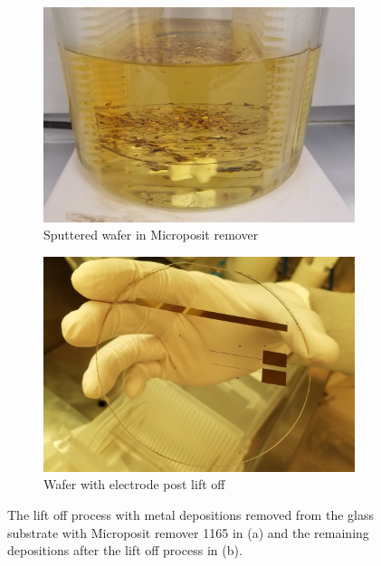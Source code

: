 \begin{figure}
    \centering
    \begin{subfigure}[b]{0.45\textwidth}
        \includegraphics[width=\textwidth]{images/lift_off.jpg}
        \caption{Sputtered wafer in Microposit remover}
        \label{fig:lift_solution}
    \end{subfigure}
    \hfill
    \begin{subfigure}[b]{0.45\textwidth}
        \centering
        \includegraphics[width=\textwidth]{images/electrodes.jpg}
        \caption{Wafer with electrode post lift off}
        \label{fig:electrode_methods}
    \end{subfigure} 
    \caption[Lift off]{The lift off process with metal depositions removed from the glass substrate with Microposit remover 1165 in (a) and the remaining depositions after the lift off process in (b).}
    \label{fig:electrode_methods}
\end{figure}

